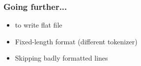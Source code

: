 \begin{frame}
 \frametitle{Going further...}
 \begin{itemize}
  \item {} to write flat file
  \item Fixed-length format (different tokenizer)
  \item Skipping badly formatted lines
 \end{itemize}
\end{frame}
